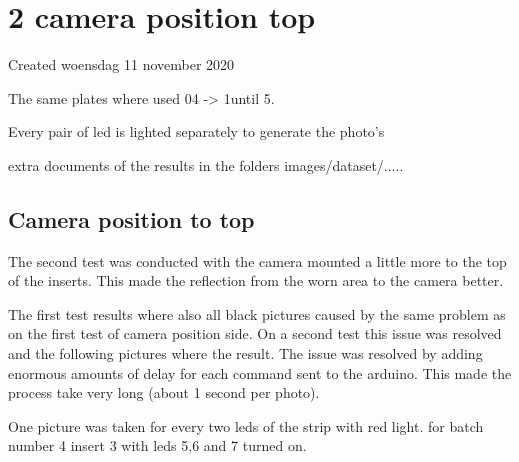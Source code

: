 \documentclass{article}
\begin{document}
		\section{2 camera position top}

Created woensdag 11 november 2020



The same plates where used 04 -\textgreater{} 1until 5. 

Every pair of led is lighted separately to generate the photo's 



extra documents of the results in the folders images/dataset/.....



\subsection{Camera position to top}

The second test was conducted with the camera mounted a little more to the top of the inserts. This made the reflection from the worn area to the camera better. 

The first test results where also all black pictures caused by the same problem as on the first test of camera position side. On a second test this issue was resolved and the following pictures where the result. The issue was resolved by adding enormous amounts of delay for each command sent to the arduino. This made the process take very long (about 1 second per photo).



One picture was taken for every two leds of the strip with red light. for batch number 4 insert 3 with leds 5,6 and 7 turned on.
\end{document}
